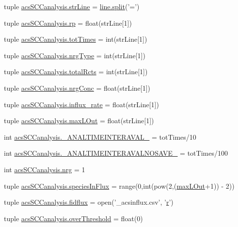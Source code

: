 \begin{DoxyCompactItemize}
\item 
tuple \hyperlink{a00128_a072631e11db72789389935b0f9efff8d}{acs\-S\-C\-Canalysis.\-str\-Line} = \hyperlink{a00059_a4d1aa74fac80ae0275c056575fdb6626}{line.\-split}('=')
\item 
tuple \hyperlink{a00128_a98150f532e09ebae495212500d2f1799}{acs\-S\-C\-Canalysis.\-rp} = float(str\-Line\mbox{[}1\mbox{]})
\item 
tuple \hyperlink{a00128_a20df40e09bc9514382d71f15783c7856}{acs\-S\-C\-Canalysis.\-tot\-Times} = int(str\-Line\mbox{[}1\mbox{]})
\item 
tuple \hyperlink{a00128_a0d0c83fd90489be59b1f5a31dadf4469}{acs\-S\-C\-Canalysis.\-nrg\-Type} = int(str\-Line\mbox{[}1\mbox{]})
\item 
tuple \hyperlink{a00128_a9f0e87ff21f3597668f5ad076224da87}{acs\-S\-C\-Canalysis.\-total\-Rcts} = int(str\-Line\mbox{[}1\mbox{]})
\item 
tuple \hyperlink{a00128_a24d5f5a61d56c596017396ad272ef4a4}{acs\-S\-C\-Canalysis.\-nrg\-Conc} = float(str\-Line\mbox{[}1\mbox{]})
\item 
tuple \hyperlink{a00128_a3a8adee26325d72aca909e91b0fd3ea5}{acs\-S\-C\-Canalysis.\-influx\-\_\-rate} = float(str\-Line\mbox{[}1\mbox{]})
\item 
tuple \hyperlink{a00128_a47da7b9153a0e4a33512f6d2675b8c1a}{acs\-S\-C\-Canalysis.\-max\-L\-Out} = float(str\-Line\mbox{[}1\mbox{]})
\item 
int \hyperlink{a00128_a46f1fb71bdcdb1c8679ae847d0d4b63f}{acs\-S\-C\-Canalysis.\-\_\-\-A\-N\-A\-L\-T\-I\-M\-E\-I\-N\-T\-E\-R\-A\-V\-A\-L\-\_\-} = tot\-Times/10
\item 
int \hyperlink{a00128_a7665e828ed7f27f4ba353e9645ad716d}{acs\-S\-C\-Canalysis.\-\_\-\-A\-N\-A\-L\-T\-I\-M\-E\-I\-N\-T\-E\-R\-A\-V\-A\-L\-N\-O\-S\-A\-V\-E\-\_\-} = tot\-Times/100
\item 
int \hyperlink{a00128_a948683f966c62ac856582281c3cda1f4}{acs\-S\-C\-Canalysis.\-nrg} = 1
\item 
tuple \hyperlink{a00128_a36f6b63269e716f42cd38a36a781a4cf}{acs\-S\-C\-Canalysis.\-species\-In\-Flux} = range(0,int(pow(2,(\hyperlink{a00113_abb126c97fed10420e64f85923bf5e04b}{max\-L\-Out}+1)) -\/ 2))
\item 
tuple \hyperlink{a00128_a0c40e4d9928e8df792b31c7a431d3fba}{acs\-S\-C\-Canalysis.\-fidflux} = open('\-\_\-acsinflux.\-csv', '\hyperlink{a00031_ac862e7284527eb913b1351c8bfb8e079}{r}')
\item 
tuple \hyperlink{a00128_a12e61f8d7aadb52256a7728af342bae3}{acs\-S\-C\-Canalysis.\-over\-Threshold} = float(0)

\end{DoxyCompactItemize}
